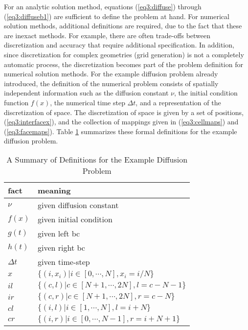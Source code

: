 \documentclass[10pt,epsf]{book}
\begin{document}
For an analytic solution method, equations (\ref{eq3:diffuse}) through
(\ref{eq3:diffuseb1}) are sufficient to define the problem at hand.
For numerical solution methods, additional definitions are required,
due to the fact that these are inexact methods.  For example, there
are often trade-offs between discretization and accuracy that require
additional specification.  In addition, since discretization for
complex geometries (grid generation) is not a completely automatic
process, the discretization becomes part of the problem definition for
numerical solution methods.  For the example diffusion problem already
introduced, the definition of the numerical problem consists of
spatially independent information such as the diffusion constant
$\nu$, the initial condition function $f(x)$, the numerical time step
$\Delta t$, and a representation of the discretization of space.  The
discretization of space is given by a set of positions,
(\ref{eq3:interfacex}), and the collection of mappings given in
(\ref{eq3:cellmaps}) and (\ref{eq3:facemaps}).  Table
\ref{table3:facts} summarizes these formal definitions for the example
diffusion problem.


\begin{table}[htbp]
\caption{ A Summary of Definitions for the Example Diffusion
  Problem}
\label{table3:facts}
\begin{center}
  \begin{tabular}{|l|l|}
    \hline
    fact      & meaning \\
    \hline
    $\nu$     & given diffusion constant  \\
    $f(x)$     & given initial condition  \\
    $g(t)$     & given left bc \\
    $h(t)$     & given right bc  \\
    $\Delta t$& given time-step  \\
    $x$       & $\lbrace (i,x_i) | i \in [0, \cdots, N], x_i = i/N    \rbrace$\\
    $il$      & $\lbrace (c,l)   | c \in [N+1, \cdots, 2N], l = c-N-1 \rbrace$\\
    $ir$      & $\lbrace (c,r)   | c \in [N+1, \cdots, 2N], r = c-N   \rbrace$\\
    $cl$      & $\lbrace (i,l)   | i \in [1, \cdots, N], l = i+N      \rbrace$\\
    $cr$      & $\lbrace (i,r)   | i \in [0, \cdots, N-1], r = i+N+1  \rbrace$\\
    \hline
  \end{tabular}
\end{center}
\end{table}
\end{document}

